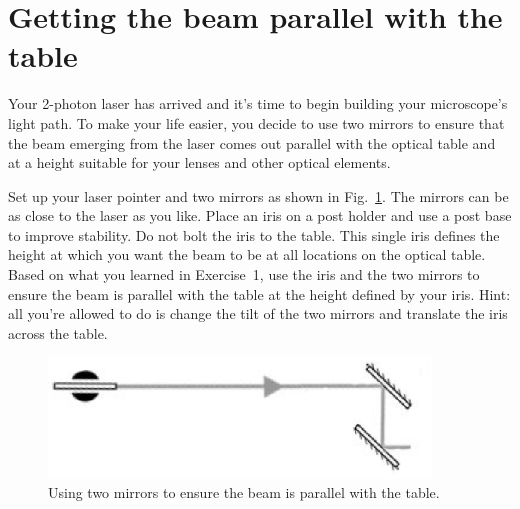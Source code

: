 \documentclass[a4paper]{report}
\begin{document}
\section{Getting the beam parallel with the table}
Your 2-photon laser has arrived and it's time to begin building your microscope's light path. 
To make your life easier, you decide to use two mirrors to ensure that the beam emerging from the laser comes out parallel with the optical table and at a height suitable for your lenses and other optical elements. 


Set up your laser pointer and two mirrors as shown in Fig.~\ref{fig:ex2}. 
The mirrors can be as close to the laser as you like. 
Place an iris on a post holder and use a post base to improve stability. 
Do not bolt the iris to the table.
This single iris defines the height at which you want the beam to be at all locations on the optical table. 
Based on what you learned in Exercise~1, use the iris and the two mirrors to ensure the beam is parallel with the table at the height defined by your iris. 
Hint: all you're allowed to do is change the tilt of the two mirrors and translate the iris across the table.


\begin{figure}[h]
\center
\includegraphics[width=4in]{laser_height.eps}
\caption{Using two mirrors to ensure the beam is parallel with the table. }
\label{fig:ex2}
\end{figure}
\end{document}

